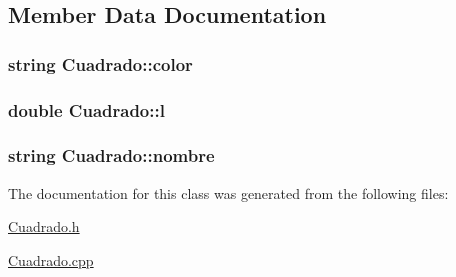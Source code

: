 \subsection{Member Data Documentation}
\hypertarget{class_cuadrado_ae8ad3499e4f99746dde86b42b3e50c2d}{
\subsubsection[{color}]{\setlength{\rightskip}{0pt plus 5cm}string Cuadrado\+::color}}\label{class_cuadrado_ae8ad3499e4f99746dde86b42b3e50c2d}
\hypertarget{class_cuadrado_ab4d463c9fd9ef33f69a6fdb33cca2a41}{
\subsubsection[{l}]{\setlength{\rightskip}{0pt plus 5cm}double Cuadrado\+::l}}\label{class_cuadrado_ab4d463c9fd9ef33f69a6fdb33cca2a41}
\hypertarget{class_cuadrado_a2d85cc9025c27709524fff4f8ee89645}{
\subsubsection[{nombre}]{\setlength{\rightskip}{0pt plus 5cm}string Cuadrado\+::nombre}}\label{class_cuadrado_a2d85cc9025c27709524fff4f8ee89645}


The documentation for this class was generated from the following files\+:\begin{DoxyCompactItemize}
\item 
\hyperlink{_cuadrado_8h}{Cuadrado.\+h}\item 
\hyperlink{_cuadrado_8cpp}{Cuadrado.\+cpp}\end{DoxyCompactItemize}
